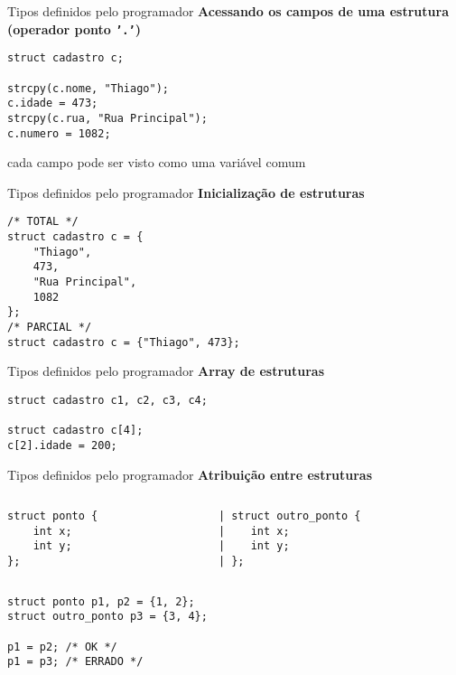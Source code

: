 \documentclass[10pt]{beamer}
\begin{document}
\begin{frame}[fragile]{Tipos definidos pelo programador}
    \huge
    \textbf{Acessando os campos de uma estrutura (operador ponto \texttt{'.'})}

    \bigskip

    \large
    \begin{verbatim}
struct cadastro c;

strcpy(c.nome, "Thiago");
c.idade = 473;
strcpy(c.rua, "Rua Principal");
c.numero = 1082;
    \end{verbatim}

    \vfill

    cada campo pode ser visto como uma variável comum
\end{frame}

\begin{frame}[fragile]{Tipos definidos pelo programador}
    \huge
    \textbf{Inicialização de estruturas}

    \large
    \begin{verbatim}
/* TOTAL */
struct cadastro c = {
    "Thiago",
    473,
    "Rua Principal",
    1082
};
/* PARCIAL */
struct cadastro c = {"Thiago", 473};
    \end{verbatim}
\end{frame}

\begin{frame}[fragile]{Tipos definidos pelo programador}
    \huge
    \textbf{Array de estruturas}

    \bigskip

    \Large
    \begin{verbatim}
struct cadastro c1, c2, c3, c4;

struct cadastro c[4];
c[2].idade = 200;
    \end{verbatim}
\end{frame}

\begin{frame}[fragile]{Tipos definidos pelo programador}
    \huge
    \textbf{Atribuição entre estruturas}

    \bigskip

    \large
    \begin{columns}
    \begin{column}{0.35\textwidth}
        \begin{verbatim}
struct ponto {
    int x;
    int y;
};
        \end{verbatim}
    \end{column}
    \begin{column}{0.55\textwidth}
        \begin{verbatim}
| struct outro_ponto {
|    int x;
|    int y;
| };
        \end{verbatim}
    \end{column}
    \end{columns}

    \begin{verbatim}
struct ponto p1, p2 = {1, 2};
struct outro_ponto p3 = {3, 4};

p1 = p2; /* OK */
p1 = p3; /* ERRADO */
    \end{verbatim}
\end{frame}
\end{document}
